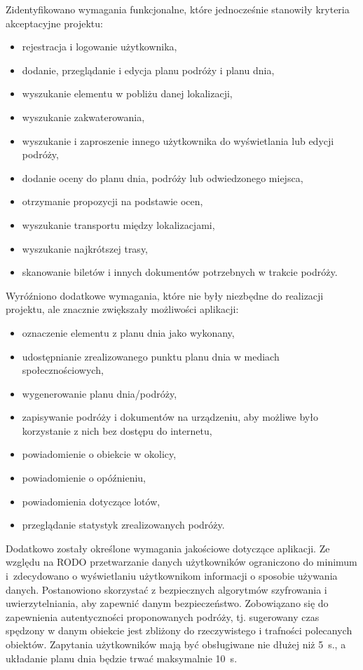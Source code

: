 \documentclass[10pt,twoside,a4paper]{report}
\begin{document}
\par
\noindent\newline Zidentyfikowano wymagania funkcjonalne, które jednocześnie stanowiły kryteria akceptacyjne projektu: 

\begin{itemize}
\item rejestracja i logowanie użytkownika,
\item dodanie, przeglądanie i edycja planu podróży i planu dnia,
\item wyszukanie elementu w pobliżu danej lokalizacji,
\item wyszukanie zakwaterowania,
\item wyszukanie i zaproszenie innego użytkownika do wyświetlania lub edycji podróży,
\item dodanie oceny do planu dnia, podróży lub odwiedzonego miejsca,
\item otrzymanie propozycji na podstawie ocen,
\item wyszukanie transportu między lokalizacjami,
\item wyszukanie najkrótszej trasy,
\item skanowanie biletów i innych dokumentów potrzebnych w trakcie podróży.
\end{itemize}

\par
\noindent Wyróźniono dodatkowe wymagania, które nie były niezbędne do realizacji projektu, ale znacznie zwiększały możliwości aplikacji: 

\begin{itemize}
\item oznaczenie elementu z planu dnia jako wykonany,
\item udostępnianie zrealizowanego punktu planu dnia w mediach społecznościowych,
\item wygenerowanie planu dnia/podróży,
\item zapisywanie podróży i dokumentów na urządzeniu, aby możliwe było korzystanie z nich bez dostępu do internetu,
\item powiadomienie o obiekcie w okolicy,
\item powiadomienie o opóźnieniu,
\item powiadomienia dotyczące lotów,
\item przeglądanie statystyk zrealizowanych podróży.
\end{itemize}

\par Dodatkowo zostały określone wymagania jakościowe dotyczące aplikacji. Ze względu na RODO przetwarzanie danych użytkowników ograniczono do minimum i~zdecydowano o wyświetlaniu użytkownikom informacji o sposobie używania danych. Postanowiono skorzystać z bezpiecznych algorytmów szyfrowania i uwierzytelniania, aby zapewnić danym bezpieczeństwo. 
Zobowiązano się do zapewnienia autentyczności proponowanych podróży, tj. sugerowany czas spędzony w danym obiekcie jest zbliżony do rzeczywistego i trafności polecanych obiektów. Zapytania użytkowników mają być obsługiwane nie dłużej niż 5~s., a układanie planu dnia będzie trwać maksymalnie 10~s.
\end{document}
